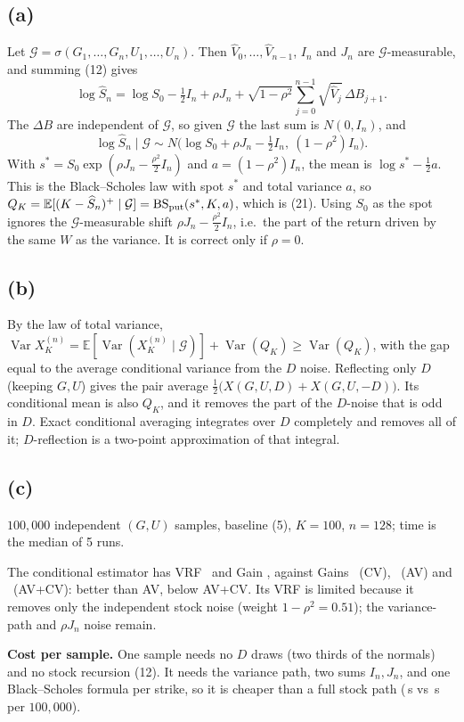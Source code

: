 \documentclass[10pt]{article}
\newcommand{\E}{\mathbb{E}}
\newcommand{\Var}{\operatorname{Var}}
\newcommand{\Vh}{\widehat V}
\newcommand{\Sh}{\widehat S}
\newcommand{\R}{../results}
\begin{document}
\subsection*{(a)}
Let $\mathcal G=\sigma(G_1,\dots,G_n,U_1,\dots,U_n)$. Then $\Vh_0,\dots,\Vh_{n-1}$, $I_n$ and $J_n$ are
$\mathcal G$-measurable, and summing (12) gives
\[
\log\Sh_n=\log S_0-\tfrac12 I_n+\rho J_n+\sqrt{1-\rho^2}\sum_{j=0}^{n-1}\sqrt{\Vh_j}\,\Delta B_{j+1}.
\]
The $\Delta B$ are independent of $\mathcal G$, so given $\mathcal G$ the last sum is $N(0,I_n)$, and
\[
\log\Sh_n\mid\mathcal G\sim N\big(\log S_0+\rho J_n-\tfrac12 I_n,\ (1-\rho^2)I_n\big).
\]
With $s^*=S_0\exp(\rho J_n-\tfrac{\rho^2}{2}I_n)$ and $a=(1-\rho^2)I_n$, the mean is
$\log s^*-\frac12 a$. This is the Black--Scholes law with spot $s^*$ and total variance $a$, so
$Q_K=\E[(K-\Sh_n)^+\mid\mathcal G]=\mathrm{BS}_{\rm put}(s^*,K,a)$, which is (21).
Using $S_0$ as the spot ignores the $\mathcal G$-measurable shift $\rho J_n-\frac{\rho^2}{2}I_n$, i.e.\
the part of the return driven by the same $W$ as the variance. It is correct only if $\rho=0$.

\subsection*{(b)}
By the law of total variance,
$\Var X_K^{(n)}=\E[\Var(X_K^{(n)}\mid\mathcal G)]+\Var(Q_K)\ge\Var(Q_K)$, with the gap equal to the
average conditional variance from the $D$ noise. Reflecting only $D$ (keeping $G,U$) gives the pair
average $\frac12\big(X(G,U,D)+X(G,U,-D)\big)$. Its conditional mean is also $Q_K$, and it removes the part
of the $D$-noise that is odd in $D$. Exact conditional averaging integrates over $D$ completely and
removes all of it; $D$-reflection is a two-point approximation of that integral.

\subsection*{(c)}
$100{,}000$ independent $(G,U)$ samples, baseline (5), $K=100$, $n=128$; time is the median of 5 runs.
\begin{table}[H]\centering\small

\caption{$K=100$: conditional estimator vs the four methods of 5(a); VRF and Gain relative to plain MC.}
\end{table}
The conditional estimator has VRF \VRFCOND\ and Gain \GainCOND, against Gains \GainCVb\ (CV), \GainAVb\ (AV)
and \GainBOTHb\ (AV+CV): better than AV, below AV+CV. Its VRF is limited because it removes only the independent stock noise
(weight $1-\rho^2=0.51$); the variance-path and $\rho J_n$ noise remain.

\textbf{Cost per sample.} One sample needs no $D$ draws (two thirds of the normals) and no stock
recursion (12). It needs the variance path, two sums $I_n,J_n$, and one Black--Scholes formula per
strike, so it is cheaper than a full stock path (\TimeCOND\,s vs \TimePL\,s per $100{,}000$).
\end{document}
